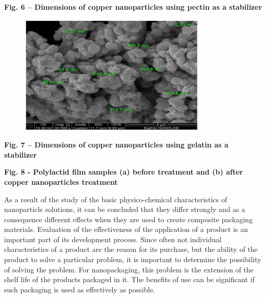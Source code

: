 {\bfseries Fig. 6 -- Dimensions of copper nanoparticles using pectin as a
stabilizer}

\begin{figure}[H]
	\centering
	\includegraphics[width=0.8\textwidth]{assets/20}
	\caption*{}
\end{figure}

{\bfseries Fig. 7 -- Dimensions of copper nanoparticles using gelatin as a
stabilizer}


{\bfseries Fig. 8 - Polylactid film samples (a) before treatment and (b)
after copper nanoparticles treatment}

As a result of the study of the basic physico-chemical characteristics
of nanoparticle solutions, it can be concluded that they differ strongly
and as a consequence different effects when they are used to create
composite packaging materials. Evaluation of the effectiveness of the
application of a product is an important part of its development
process. Since often not individual characteristics of a product are the
reason for its purchase, but the ability of the product to solve a
particular problem, it is important to determine the possibility of
solving the problem. For nanopackaging, this problem is the extension of
the shelf life of the products packaged in it. The benefits of use can
be significant if such packaging is used as effectively as possible.

